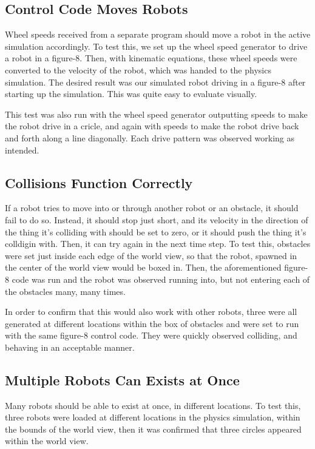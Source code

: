 \subsection{Control Code Moves Robots}
Wheel speeds received from a separate program should move a robot in the active simulation accordingly. To test this, we set up the wheel speed generator to drive a robot in a figure-8. Then, with kinematic equations, these wheel speeds were converted to the velocity of the robot, which was handed to the physics simulation. The desired result was our simulated robot driving in a figure-8 after starting up the simulation. This was quite easy to evaluate visually.

This test was also run with the wheel speed generator outputting speeds to make the robot drive in a cricle, and again with speeds to make the robot drive back and forth along a line diagonally. Each drive pattern was observed working as intended.

\subsection{Collisions Function Correctly}
If a robot tries to move into or through another robot or an obstacle, it should fail to do so. Instead, it should stop just short, and its velocity in the direction of the thing it's colliding with should be set to zero, or it should push the thing it's colldigin with. Then, it can try again in the next time step. To test this, obstacles were set just inside each edge of the world view, so that the robot, spawned in the center of the world view would be boxed in. Then, the aforementioned figure-8 code was run and the robot was observed running into, but not entering each of the obstacles many, many times. 

In order to confirm that this would also work with other robots, three were all generated at different locations within the box of obstacles and were set to run with the same figure-8 control code. They were quickly observed colliding, and behaving in an acceptable manner.

\subsection{Multiple Robots Can Exists at Once}
Many robots should be able to exist at once, in different locations. To test this, three robots were loaded at different locations in the physics simulation, within the bounds of the world view, then it was confirmed that three circles appeared within the world view.

